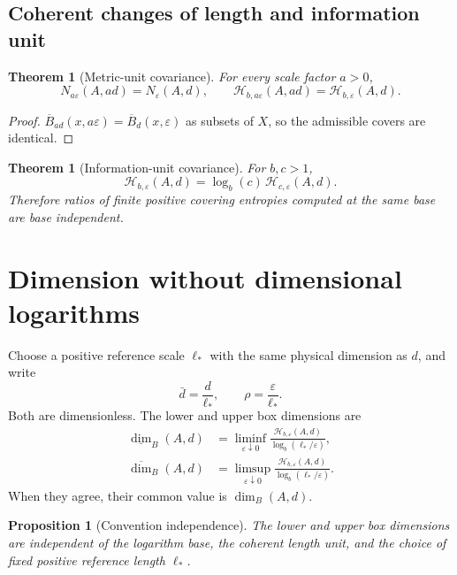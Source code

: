 \documentclass[11pt,a4paper]{article}
\theoremstyle{definition}
\theoremstyle{plain}
\newtheorem{theorem}[definition]{Theorem}
\newtheorem{proposition}[definition]{Proposition}
\theoremstyle{remark}
\newcommand{\Hmet}{\mathscr{H}}
\begin{document}
\subsection{Coherent changes of length and information unit}

\begin{theorem}[Metric-unit covariance]
\label{thm:metric-rescale}
For every scale factor $a>0$,
\[
N_{a\varepsilon}(A,ad)=N_\varepsilon(A,d),
\qquad
\Hmet_{b,a\varepsilon}(A,ad)
=
\Hmet_{b,\varepsilon}(A,d).
\]
\end{theorem}

\begin{proof}
$\overline B_{ad}(x,a\varepsilon)=
\overline B_d(x,\varepsilon)$ as subsets of $X$, so the admissible covers
are identical.
\end{proof}

\begin{theorem}[Information-unit covariance]
\label{thm:metric-base}
For $b,c>1$,
\[
\Hmet_{b,\varepsilon}(A,d)
=
\log_b(c)\,\Hmet_{c,\varepsilon}(A,d).
\]
Therefore ratios of finite positive covering entropies computed at the
same base are base independent.
\end{theorem}

\section{Dimension without dimensional logarithms}

Choose a positive reference scale $\ell_*$ with the same physical
dimension as $d$, and write
\[
\bar d=\frac{d}{\ell_*},
\qquad
\rho=\frac{\varepsilon}{\ell_*}.
\]
Both are dimensionless. The lower and upper box dimensions are
\begin{align}
\underline{\dim}_{B}(A,d)
&=
\liminf_{\varepsilon\downarrow0}
\frac{\Hmet_{b,\varepsilon}(A,d)}
{\log_b(\ell_*/\varepsilon)},\\
\overline{\dim}_{B}(A,d)
&=
\limsup_{\varepsilon\downarrow0}
\frac{\Hmet_{b,\varepsilon}(A,d)}
{\log_b(\ell_*/\varepsilon)}.
\end{align}
When they agree, their common value is $\dim_B(A,d)$.

\begin{proposition}[Convention independence]
\label{prop:dimension-invariance}
The lower and upper box dimensions are independent of the logarithm base,
the coherent length unit, and the choice of fixed positive reference
length $\ell_*$.
\end{proposition}
\end{document}
